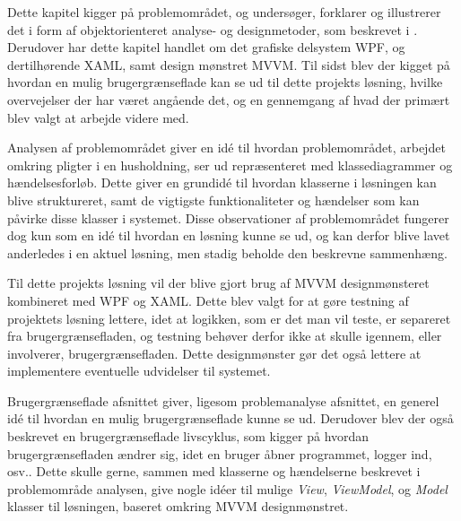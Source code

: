 Dette kapitel kigger på problemområdet, og undersøger, forklarer og illustrerer det i form af objektorienteret analyse- og designmetoder, som beskrevet i \cite{ObjektAnalyseDesign}. Derudover har dette kapitel handlet om det grafiske delsystem WPF, og dertilhørende XAML, samt design mønstret MVVM. Til sidst blev der kigget på hvordan en mulig brugergrænseflade kan se ud til dette projekts løsning, hvilke overvejelser der har været angående det, og en gennemgang af hvad der primært blev valgt at arbejde videre med.

Analysen af problemområdet giver en idé til hvordan problemområdet, arbejdet omkring pligter i en husholdning, ser ud repræsenteret med klassediagrammer og hændelsesforløb. Dette giver en grundidé til hvordan klasserne i løsningen kan blive struktureret, samt de vigtigste funktionaliteter og hændelser som kan påvirke disse klasser i systemet. Disse observationer af problemområdet fungerer dog kun som en idé til hvordan en løsning kunne se ud, og kan derfor blive lavet anderledes i en aktuel løsning, men stadig beholde den beskrevne sammenhæng.

Til dette projekts løsning vil der blive gjort brug af MVVM designmønsteret kombineret med WPF og XAML. Dette blev valgt for at gøre testning af projektets løsning lettere, idet at logikken, som er det man vil teste, er separeret fra brugergrænsefladen, og testning behøver derfor ikke at skulle igennem, eller involverer, brugergrænsefladen. Dette designmønster gør det også lettere at implementere eventuelle udvidelser til systemet.

Brugergrænseflade afsnittet giver, ligesom problemanalyse afsnittet, en generel idé til hvordan en mulig brugergrænseflade kunne se ud. Derudover blev der også beskrevet en brugergrænseflade livscyklus, som kigger på hvordan brugergrænsefladen ændrer sig, idet en bruger åbner programmet, logger ind, osv.. Dette skulle gerne, sammen med klasserne og hændelserne beskrevet i problemområde analysen, give nogle idéer til mulige \textit{View}, \textit{ViewModel}, og \textit{Model} klasser til løsningen, baseret omkring MVVM designmønstret.